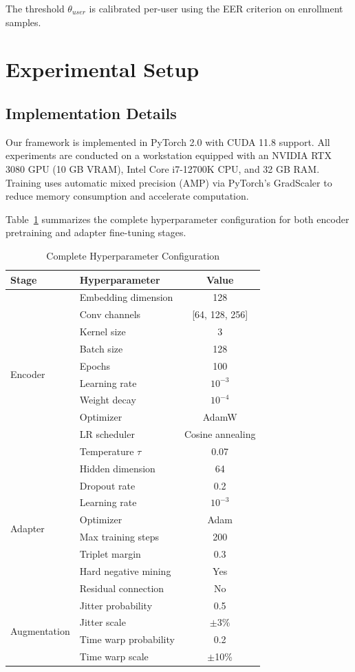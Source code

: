 \documentclass{ieeeaccess}
\begin{document}
{The threshold $\theta_{user}$ is calibrated per-user using the EER criterion on enrollment samples.

\section{Experimental Setup}
\label{sec:experiments}

\subsection{Implementation Details}
Our framework is implemented in PyTorch 2.0 with CUDA 11.8 support. All experiments are conducted on a workstation equipped with an NVIDIA RTX 3080 GPU (10 GB VRAM), Intel Core i7-12700K CPU, and 32 GB RAM. Training uses automatic mixed precision (AMP) via PyTorch's GradScaler to reduce memory consumption and accelerate computation.

Table~\ref{tab:hyperparams} summarizes the complete hyperparameter configuration for both encoder pretraining and adapter fine-tuning stages.

\begin{table}[h]
\caption{Complete Hyperparameter Configuration}
\label{tab:hyperparams}
\centering
\begin{tabular}{|l|l|c|}
\hline
\textbf{Stage} & \textbf{Hyperparameter} & \textbf{Value} \\
\hline
\multirow{10}{*}{Encoder} & Embedding dimension & 128 \\
& Conv channels & [64, 128, 256] \\
& Kernel size & 3 \\
& Batch size & 128 \\
& Epochs & 100 \\
& Learning rate & $10^{-3}$ \\
& Weight decay & $10^{-4}$ \\
& Optimizer & AdamW \\
& LR scheduler & Cosine annealing \\
& Temperature $\tau$ & 0.07 \\
\hline
\multirow{8}{*}{Adapter} & Hidden dimension & 64 \\
& Dropout rate & 0.2 \\
& Learning rate & $10^{-3}$ \\
& Optimizer & Adam \\
& Max training steps & 200 \\
& Triplet margin & 0.3 \\
& Hard negative mining & Yes \\
& Residual connection & No \\
\hline
\multirow{4}{*}{Augmentation} & Jitter probability & 0.5 \\
& Jitter scale & $\pm$3\% \\
& Time warp probability & 0.2 \\
& Time warp scale & $\pm$10\% \\
\hline
\end{tabular}
\end{table}

}
\end{document}

